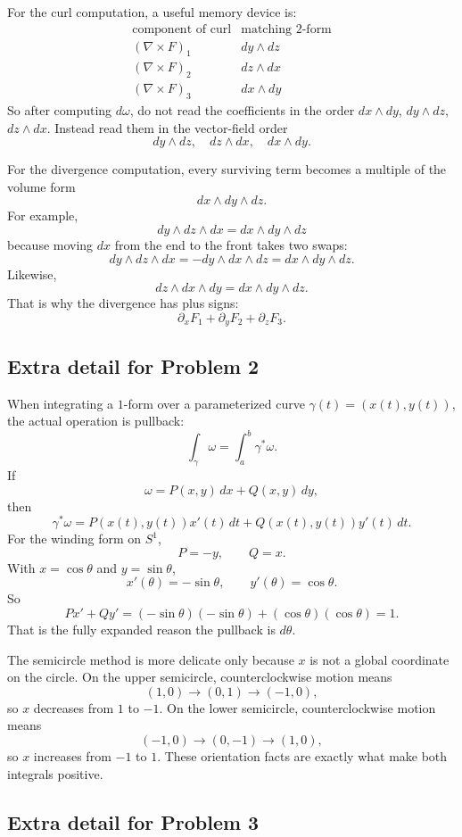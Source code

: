 \documentclass[11pt]{article}
\newcommand{\pd}{\partial}
\begin{document}
For the curl computation, a useful memory device is:
\[
\begin{array}{c|c}
\text{component of curl} & \text{matching }2\text{-form}\\ \hline
(\nabla\times F)_1 & dy\wedge dz\\
(\nabla\times F)_2 & dz\wedge dx\\
(\nabla\times F)_3 & dx\wedge dy
\end{array}
\]
So after computing $d\omega$, do not read the coefficients in the order
$dx\wedge dy$, $dy\wedge dz$, $dz\wedge dx$. Instead read them in the vector-field order
\[
 dy\wedge dz,\quad dz\wedge dx,\quad dx\wedge dy.
\]

For the divergence computation, every surviving term becomes a multiple of the volume form
\[
 dx\wedge dy\wedge dz.
\]
For example,
\[
 dy\wedge dz\wedge dx=dx\wedge dy\wedge dz
\]
because moving $dx$ from the end to the front takes two swaps:
\[
 dy\wedge dz\wedge dx
 =
 -dy\wedge dx\wedge dz
 =
 dx\wedge dy\wedge dz.
\]
Likewise,
\[
 dz\wedge dx\wedge dy=dx\wedge dy\wedge dz.
\]
That is why the divergence has plus signs:
\[
 \pd_xF_1+\pd_yF_2+\pd_zF_3.
\]

\subsection*{Extra detail for Problem 2}

When integrating a $1$-form over a parameterized curve $\gamma(t)=(x(t),y(t))$, the actual operation is pullback:
\[
 \int_\gamma \omega=\int_a^b \gamma^*\omega.
\]
If
\[
 \omega=P(x,y)\,dx+Q(x,y)\,dy,
\]
then
\[
 \gamma^*\omega
 =
 P(x(t),y(t))x'(t)\,dt
 +
 Q(x(t),y(t))y'(t)\,dt.
\]
For the winding form on $S^1$,
\[
 P=-y,\qquad Q=x.
\]
With $x=\cos\theta$ and $y=\sin\theta$,
\[
 x'(\theta)=-\sin\theta,\qquad y'(\theta)=\cos\theta.
\]
So
\[
 P x'+Q y'
 =
 (-\sin\theta)(-\sin\theta)+(\cos\theta)(\cos\theta)
 =
 1.
\]
That is the fully expanded reason the pullback is $d\theta$.

The semicircle method is more delicate only because $x$ is not a global coordinate on the circle. On the upper semicircle, counterclockwise motion means
\[
 (1,0)\to(0,1)\to(-1,0),
\]
so $x$ decreases from $1$ to $-1$. On the lower semicircle, counterclockwise motion means
\[
 (-1,0)\to(0,-1)\to(1,0),
\]
so $x$ increases from $-1$ to $1$. These orientation facts are exactly what make both integrals positive.

\subsection*{Extra detail for Problem 3}
\end{document}
